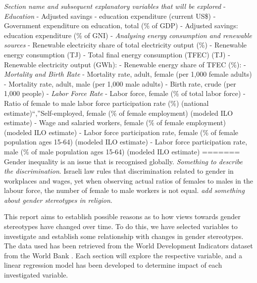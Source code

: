 \documentclass[11pt,a4paper,]{article}
\begin{document}
\emph{Section name and subsequent explanatory variables that will be
explored} - \emph{Education} - Adjusted savings - education expenditure
(current US\$) - Government expenditure on education, total (\% of GDP)
- Adjusted savings: education expenditure (\% of GNI) - \emph{Analysing
energy consumption and renewable sources} - Renewable electricity share
of total electricity output (\%) - Renewable energy consumption (TJ) -
Total final energy consumption (TFEC) (TJ) - Renewable electricity
output (GWh): - Renewable energy share of TFEC (\%): - \emph{Mortality
and Birth Rate} - Mortality rate, adult, female (per 1,000 female
adults) - Mortality rate, adult, male (per 1,000 male adults) - Birth
rate, crude (per 1,000 people) - \emph{Labor Force Rate} - Labor force,
female (\% of total labor force) - Ratio of female to male labor force
participation rate (\%) (national estimate)``,''Self-employed, female
(\% of female employment) (modeled ILO estimate) - Wage and salaried
workers, female (\% of female employment) (modeled ILO estimate) - Labor
force participation rate, female (\% of female population ages 15-64)
(modeled ILO estimate) - Labor force participation rate, male (\% of
male population ages 15-64) (modeled ILO estimate)
=======
Gender inequality is an issue that is recognised globally. \emph{Something to describe the discrimination}. Israeli law rules that discrimination related to gender in workplaces and wages, yet when observing actual ratios of females to males in the labour force, the number of female to male workers is not equal. \emph{add something about gender stereotypes in religion}.

This report aims to establish possible reasons as to how views towards gender stereotypes have changed over time. To do this, we have selected variables to investigate and establish some relationship with changes in gender stereotypes. The data used has been retrieved from the World Development Indicators dataset from the World Bank \textcite{TheWorldBank2020}. Each section will explore the respective variable, and a linear regression model has been developed to determine impact of each investigated variable.
\end{document}
